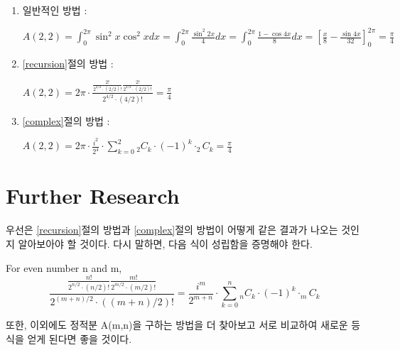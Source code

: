 \documentclass[11pt]{article}
\begin{document}
\begin{enumerate}
	\item 일반적인 방법 : 
	
	$A(2,2) = \int_{0}^{2\pi}{\sin^2{x}\cos^2{x}dx}
	= \int_{0}^{2\pi}{\frac{\sin^2{2x}}{4}dx}
	= \int_{0}^{2\pi}{\frac{1-\cos{4x}}{8}dx}
	= [\frac{x}{8}-\frac{\sin{4x}}{32}]_{0}^{2\pi}
	= \frac{\pi}{4}
	$
	
	\item \ref{recursion}절의 방법 :
	
	$A(2,2) = 2\pi \cdot \frac{\frac{2!}{2^{2/2}\cdot(2/2)!}\frac{2!}{2^{2/2}\cdot(2/2)!}}{2^{4/2}\cdot(4/2)!}
	= \frac{\pi}{4}
	$
	
	\item \ref{complex}절의 방법 : 
	
	$A(2,2) = 2\pi \cdot \frac{i^2}{2^4} \cdot \sum_{k=0}^{2}{_{2}C_k \cdot (-1)^k \cdot _{2}C_k}
	= \frac{\pi}{4}
	$
	
\end{enumerate}


\section{Further Research}
우선은 \ref{recursion}절의 방법과 \ref{complex}절의 방법이 어떻게 같은 결과가 나오는 것인지 알아보아야 할 것이다. 다시 말하면, 다음 식이 성립함을 증명해야 한다.

For even number n and m,  
$$
\frac{\frac{n!}{2^{n/2}\cdot(n/2)!}\frac{m!}{2^{m/2}\cdot(m/2)!}}{2^{(m+n)/2}\cdot((m+n)/2)!} = \frac{i^m}{2^{m+n}} \cdot \sum_{k=0}^{n}{_{n}C_k \cdot (-1)^k \cdot _{m}C_k}
$$

또한, 이외에도 정적분 A(m,n)을 구하는 방법을 더 찾아보고 서로 비교하여 새로운 등식을 얻게 된다면 좋을 것이다.
\end{document}
